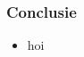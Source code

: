 \begin{frame}\frametitle{Conclusie}
    \begin{itemize}
        \item hoi
    \end{itemize}
\end{frame}
